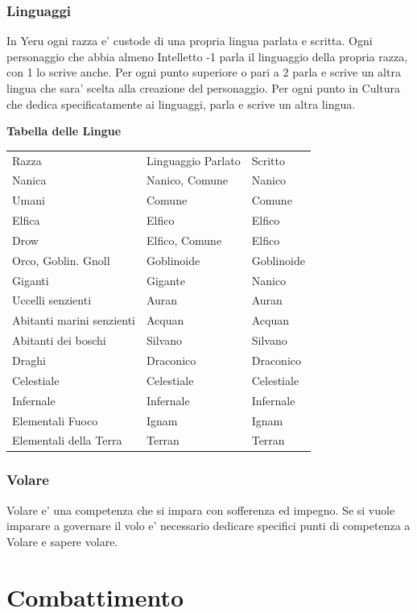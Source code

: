 \documentclass[a4paper,11pt,twoside,openany]{dndbook}
\begin{document}
\bigskip

\subsubsection{Linguaggi}

\label{linguaggi}

In Yeru ogni razza e' custode di una propria lingua parlata e scritta. Ogni personaggio che abbia almeno Intelletto -1 parla il linguaggio della propria razza, con 1 lo scrive anche. 
Per ogni punto superiore o pari a 2 parla e scrive un altra lingua che sara' scelta alla creazione del personaggio.
Per ogni punto in Cultura che dedica specificatamente ai linguaggi, parla e scrive un altra lingua.

\bigskip

\textbf{Tabella delle Lingue}

\begin{tabular}[c]{@{}lll@{}}
\toprule 
Razza & Linguaggio Parlato & Scritto\tabularnewline
Nanica & Nanico, Comune & Nanico\tabularnewline
Umani & Comune & Comune\tabularnewline
Elfica & Elfico & Elfico\tabularnewline
Drow & Elfico, Comune & Elfico\tabularnewline
Orco, Goblin. Gnoll & Goblinoide & Goblinoide\tabularnewline
Giganti & Gigante & Nanico\tabularnewline
Uccelli senzienti & Auran & Auran\tabularnewline
Abitanti marini senzienti & Acquan & Acquan\tabularnewline
Abitanti dei boschi & Silvano & Silvano\tabularnewline
Draghi & Draconico & Draconico\tabularnewline
Celestiale & Celestiale & Celestiale\tabularnewline
Infernale & Infernale & Infernale\tabularnewline
Elementali Fuoco & Ignam & Ignam\tabularnewline
Elementali della Terra & Terran & Terran\tabularnewline
\bottomrule
\end{tabular}

\subsubsection{Volare}

\label{volare}

Volare e' una competenza che si impara con sofferenza ed impegno. Se si vuole imparare a governare il volo e' necessario dedicare specifici punti di competenza a Volare e sapere volare.

\pagebreak

\section{Combattimento}
\end{document}

